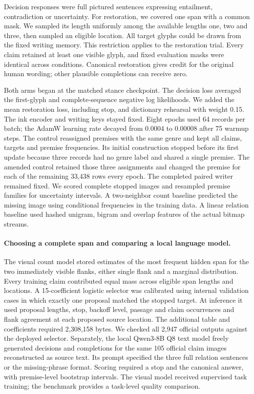 \documentclass[12pt,a4paper]{article}
\providecommand{\DIFadd}[1]{{\protect\color{blue} \sf #1}} %
\begin{document}
\DIFadd{Decision responses were full pictured sentences expressing entailment, contradiction or uncertainty. For restoration, we covered one span with a common mask. We sampled its length uniformly among the available lengths one, two and three, then sampled an eligible location. All target glyphs could be drawn from the fixed writing memory. This restriction applies to the restoration trial. Every claim retained at least one visible glyph, and fixed evaluation masks were identical across conditions. Canonical restoration gives credit for the original human wording; other plausible completions can receive zero.
}

\DIFadd{Both arms began at the matched stance checkpoint. The decision loss averaged the first-glyph and complete-sequence negative log likelihoods. We added the mean restoration loss, including stop, and dictionary rehearsal with weight 0.15. The ink encoder and writing keys stayed fixed. Eight epochs used 64 records per batch; the AdamW learning rate decayed from 0.0004 to 0.00008 after 75 warmup steps. The control reassigned premises with the same genre and kept all claims, targets and premise frequencies. Its initial construction stopped before its first update because three records had no genre label and shared a single premise. The amended control retained those three assignments and changed the premise for each of the remaining 33,438 rows every epoch. The completed paired writer remained fixed. We scored complete stopped images and resampled premise families for uncertainty intervals. A two-neighbor count baseline predicted the missing image using conditional frequencies in the training data. A linear relation baseline used hashed unigram, bigram and overlap features of the actual bitmap streams.
}

\paragraph{\DIFadd{Choosing a complete span and comparing a local language model.}}
\DIFadd{The visual count model stored estimates of the most frequent hidden span for the two immediately visible flanks, either single flank and a marginal distribution. Every training claim contributed equal mass across eligible span lengths and locations. A 15-coefficient logistic selector was calibrated using internal validation cases in which exactly one proposal matched the stopped target. At inference it used proposal lengths, stop, backoff level, passage and claim occurrences and flank agreement at each proposed source location. The additional table and coefficients required 2,308,158 bytes. We checked all 2,947 official outputs against the deployed selector. Separately, the local Qwen3-8B Q8 text model freely generated decisions and completions for the same 105 official claim images reconstructed as source text. Its prompt specified the three full relation sentences or the missing-phrase format. Scoring required a stop and the canonical answer, with premise-level bootstrap intervals. The visual model received supervised task training; the benchmark provides a task-level quality comparison.
}
\end{document}
